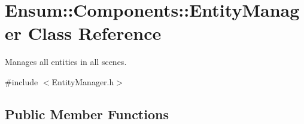 \hypertarget{class_ensum_1_1_components_1_1_entity_manager}{}\section{Ensum\+:\+:Components\+:\+:Entity\+Manager Class Reference}
\label{class_ensum_1_1_components_1_1_entity_manager}


Manages all entities in all scenes.  




{\ttfamily \#include $<$Entity\+Manager.\+h$>$}

\subsection*{Public Member Functions}
